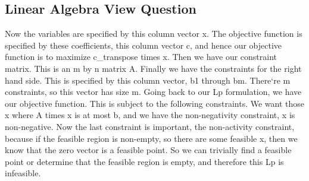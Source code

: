 \subsection{Linear Algebra View Question}
Now the variables are specified by this column vector x.
The objective function is specified by these coefficients, this column vector c, and hence our objective function is to maximize c\_transpose times x.
Then we have our constraint matrix.
This is an m by n matrix A\@.
Finally we have the constraints for the right hand side.
This is specified by this column vector, b1 through bm.
There`re m constraints, so this vector has size m.
Going back to our Lp formulation, we have our objective function.
This is subject to the following constraints.
We want those x where A times x is at most b, and we have the non-negativity constraint, x is non-negative.
Now the last constraint is important, the non-activity constraint, because if the feasible region is non-empty, so there are some feasible x, then we know that the zero vector is a feasible point.
So we can trivially find a feasible point or determine that the feasible region is empty, and therefore this Lp is infeasible.

